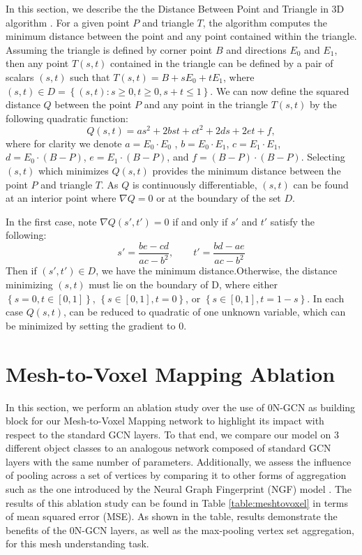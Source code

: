 \documentclass{article}
\begin{document}
In this section, we describe the the Distance Between Point and Triangle in 3D algorithm \cite{Point2Tri}. 
For a given point $P$ and triangle $T$, the algorithm computes the minimum distance between the point and any point contained within the triangle. Assuming the triangle is defined by corner point $B$ and directions $E_0$ and $E_1$, then any point $T(s,t)$ contained in the triangle can be defined by a pair of scalars $(s,t)$ such that $T(s,t) = B +sE_0 + tE_1$, where $(s, t) \in D = \left\{ (s,t) :s \geq 0 , t \geq 0, s+t \leq 1 \right\}$. We can now define the squared distance $Q$ between the point $P$ and any point in the triangle $T(s,t)$ by the following quadratic function: 
\begin{equation}
Q(s,t) =  as^2 + 2bst + ct^2 + 2ds + 2et + f,
\end{equation}
where for clarity we denote $a = E_0 \cdot E_0$ , $b = E_0 \cdot E_1$, $c = E_1 \cdot E_1$, $d = E_0 \cdot (B - P)$, $e = E_1 \cdot (B - P)$, and $f = (B - P) \cdot (B - P)$. Selecting $(s,t)$ which minimizes $Q(s,t)$ provides the minimum distance between the point $P$ and triangle $T$. As $Q$ is continuously differentiable, $(s,t)$ can be found at an interior point where $\nabla Q = 0$ or at the boundary of the set $D$. 

In the first case, note $\nabla Q(s',t') = 0$ if and only if $s'$ and $t'$ satisfy the following:
\begin{equation}
s' = \frac{be - cd}{ac-b^2}, \qquad t' = \frac{bd - ae}{ac-b^2}
\end{equation}
Then if $(s',t') \in D$, we have the minimum distance.Otherwise, the distance minimizing $(s,t)$ must lie on the boundary of D, where either $\left\{s=0, t \in [0,1]\right\}$, $\left\{s\in[0,1], t = 0 \right\}$, or $\left\{s\in[0,1], t = 1-s\right\}$. In each case $Q(s,t)$, can be reduced to quadratic of one unknown variable, which can be minimized by setting the gradient to $0$.

\section{Mesh-to-Voxel Mapping Ablation}

In this section, we perform an ablation study over the use of 0N-GCN as building block for our Mesh-to-Voxel Mapping network to highlight its impact with respect to the standard GCN layers. To that end, we compare our model on 3 different object classes to an analogous network composed of standard GCN layers with the same number of parameters. Additionally, we assess the influence of pooling across a set of vertices by comparing it to other forms of aggregation such as the one introduced by the Neural Graph Fingerprint (NGF) model \cite{FingerPrint}. The results of this ablation study can be found in Table \ref{table:meshtovoxel} in terms of mean squared error (MSE). As shown in the table, results demonstrate the benefits of the 0N-GCN layers, as well as the max-pooling vertex set aggregation, for this mesh understanding task.
\end{document}
